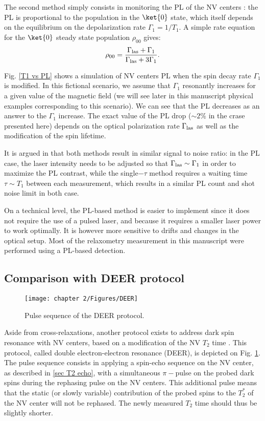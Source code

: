 \documentclass[a4paper, 11pt]{report}
\begin{document}
 The second method simply consists in monitoring the PL of the NV centers : the PL is proportional to the population in the $\ket{0}$ state, which itself depends on the equilibrium on the depolarization rate $\Gamma_1=1/T_1$. A simple rate equation for the $\ket{0}$ steady state population $\rho_{00}$ gives:
 \begin{equation}
 \rho_{00}=\frac{\Gamma_{\rm las}+\Gamma_1}{\Gamma_{\rm las}+3\Gamma_1}.
 \end{equation}
 
 Fig. \ref{T1 vs PL} shows a simulation of NV centers PL when the spin decay rate $\Gamma_1$ is modified. In this fictional scenario, we assume that $\Gamma_1$ resonantly increases for a given value of the magnetic field (we will see later in this manuscript physical examples corresponding to this scenario). We can see that the PL decreases as an answer to the $\Gamma_1$ increase. The exact value of the PL drop ($\sim 2\%$ in the crase presented here) depends on the optical polarization rate $\Gamma_{\rm las}$ as well as the modification of the spin lifetime. 

It is argued in \citep{finco2021imaging} that both methods result in similar signal to noise ratio: in the PL case, the laser intensity needs to be adjusted so that $\Gamma_{\rm las} \sim \Gamma_1$ in order to maximize the PL contrast, while the single$-\tau$ method requires a waiting time $\tau \sim T_1$ between each measurement, which results in a similar PL count and shot noise limit in both case.

On a technical level, the PL-based method is easier to implement since it does not require the use of a pulsed laser, and because it requires a smaller laser power to work optimally. It is however more sensitive to drifts and changes in the optical setup. Most of the relaxometry measurement in this manuscript were performed using a PL-based detection.

\subsection{Comparison with DEER protocol}

\begin{figure}[h]
\centering
\texttt{[image: chapter 2/Figures/DEER]}
\caption{Pulse sequence of the DEER protocol.}
\label{DEER}
\end{figure}

Aside from cross-relaxations, another protocol exists to address dark spin resonance with NV centers, based on a modification of the NV $T_2$ time \citep{mamin2012detecting, serbyn2014interferometric}. This protocol, called double electron-electron resonance (DEER), is depicted on Fig. \ref{DEER}. The pulse sequence consists in applying a spin-echo sequence on the NV center, as described in \ref{sec T2 echo}, with a simultaneous $\pi-$pulse on the probed dark spins during the rephasing pulse on the NV centers. This additional pulse means that the static (or slowly variable) contribution of the probed spins to the $T_2^*$ of the NV center will not be rephased. The newly measured $T_2$ time should thus be slightly shorter.
\end{document}
